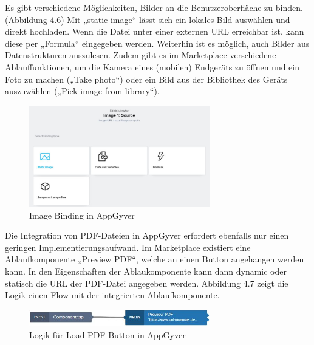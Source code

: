 Es gibt verschiedene Möglichkeiten, Bilder an die Benutzeroberfläche zu binden. (Abbildung 4.6) Mit „static image“ lässt sich ein lokales Bild auswählen und direkt hochladen. Wenn die Datei unter einer externen URL erreichbar ist, kann diese per „Formula“ eingegeben werden. Weiterhin ist es möglich, auch Bilder aus Datenstrukturen auszulesen. Zudem gibt es im Marketplace verschiedene Ablauffunktionen, um die Kamera eines (mobilen) Endgeräts zu öffnen und ein Foto zu machen („Take photo“) oder ein Bild aus der Bibliothek des Geräts auszuwählen („Pick image from library“).

\begin{figure}[htbp]
 \centering
 \includegraphics[width=0.7\textwidth]{Bilder/appgyver/4_6_Image_binding_in_AppGyver.jpg}
 \caption{Image Binding in AppGyver}
\end{figure}

Die Integration von PDF-Dateien in AppGyver erfordert ebenfalls nur einen geringen Implementierungsaufwand. Im Marketplace existiert eine Ablaufkomponente „Preview PDF“, welche an einen Button angehangen werden kann. In den Eigenschaften der Ablaukomponente kann dann dynamic oder statisch die URL der PDF-Datei angegeben werden. Abbildung 4.7 zeigt die Logik einen Flow mit der integrierten Ablaufkomponente. 

\begin{figure}[htbp]
 \centering
 \includegraphics[width=0.7\textwidth]{Bilder/appgyver/4_7_Logik_Load-PDF-Button.jpg}
 \caption{Logik für Load-PDF-Button in AppGyver}
\end{figure}

